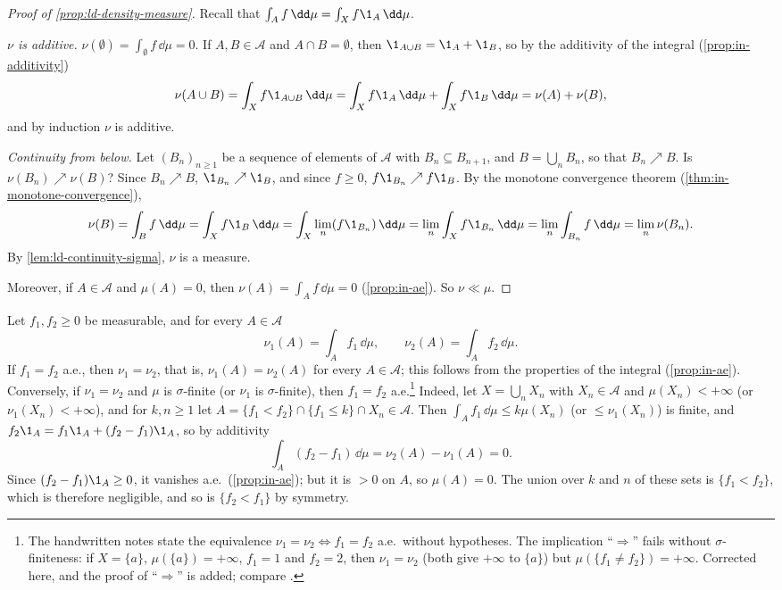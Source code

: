 \begin{proof}[Proof of \cref{prop:ld-density-measure}]
Recall that $\int_Af\,\dd\mu=\int_Xf\1_A\,\dd\mu$.

\emph{$\nu$ is additive.} $\nu(\emptyset)=\int_\emptyset f\,\dd\mu=0$. If $A,B\in\mathcal A$ and
$A\cap B=\emptyset$, then $\1_{A\cup B}=\1_A+\1_B$, so by the additivity of the integral
(\cref{prop:in-additivity})
\[
  \nu(A\cup B)=\int_Xf\1_{A\cup B}\,\dd\mu=\int_Xf\1_A\,\dd\mu+\int_Xf\1_B\,\dd\mu=\nu(A)+\nu(B),
\]
and by induction $\nu$ is additive.

\emph{Continuity from below.} Let $(B_n)_{n\ge1}$ be a sequence of elements of $\mathcal A$ with
$B_n\subseteq B_{n+1}$, and $B=\bigcup_nB_n$, so that $B_n\nearrow B$. Is
$\nu(B_n)\nearrow\nu(B)$? Since $B_n\nearrow B$, $\1_{B_n}\nearrow\1_B$, and since $f\ge0$,
$f\1_{B_n}\nearrow f\1_B$. By the monotone convergence theorem
(\cref{thm:in-monotone-convergence}),
\[
  \nu(B)=\int_Bf\,\dd\mu=\int_Xf\1_B\,\dd\mu=\int_X\lim_n(f\1_{B_n})\,\dd\mu=\lim_n\int_Xf\1_{B_n}\,\dd\mu
  =\lim_n\int_{B_n}f\,\dd\mu=\lim_n\nu(B_n).
\]
By \cref{lem:ld-continuity-sigma}, $\nu$ is a measure.

Moreover, if $A\in\mathcal A$ and $\mu(A)=0$, then $\nu(A)=\int_Af\,\dd\mu=0$
(\cref{prop:in-ae}). So $\nu\ll\mu$.
\end{proof}

\begin{remark}\label{rem:ld-density-unique}
Let $f_1,f_2\ge0$ be measurable, and for every $A\in\mathcal A$
\[
  \nu_1(A)=\int_Af_1\,\dd\mu,\qquad\nu_2(A)=\int_Af_2\,\dd\mu .
\]
If $f_1=f_2$ a.e., then $\nu_1=\nu_2$, that is, $\nu_1(A)=\nu_2(A)$ for every $A\in\mathcal A$;
this follows from the properties of the integral (\cref{prop:in-ae}). Conversely, if $\nu_1=\nu_2$
and $\mu$ is $\sigma$-finite (or $\nu_1$ is $\sigma$-finite), then $f_1=f_2$
a.e.\footnote{The handwritten notes state the equivalence $\nu_1=\nu_2\iff f_1=f_2$ a.e.\ without
hypotheses. The implication ``$\Rightarrow$'' fails without $\sigma$-finiteness: if
$X=\{a\}$, $\mu(\{a\})=+\infty$, $f_1=1$ and $f_2=2$, then $\nu_1=\nu_2$ (both give $+\infty$ to
$\{a\}$) but $\mu(\{f_1\ne f_2\})=+\infty$. Corrected here, and the proof of ``$\Rightarrow$'' is
added; compare \citet[Section~16, ``Densities'']{billingsley}.} Indeed, let
$X=\bigcup_nX_n$ with $X_n\in\mathcal A$ and $\mu(X_n)<+\infty$ (or $\nu_1(X_n)<+\infty$), and for
$k,n\ge1$ let $A=\{f_1<f_2\}\cap\{f_1\le k\}\cap X_n\in\mathcal A$. Then
$\int_Af_1\,\dd\mu\le k\mu(X_n)$ (or $\le\nu_1(X_n)$) is finite, and
$f_2\1_A=f_1\1_A+(f_2-f_1)\1_A$, so by additivity
\[
  \int_A(f_2-f_1)\,\dd\mu=\nu_2(A)-\nu_1(A)=0 .
\]
Since $(f_2-f_1)\1_A\ge0$, it vanishes a.e.\ (\cref{prop:in-ae}); but it is $>0$ on $A$, so
$\mu(A)=0$. The union over $k$ and $n$ of these sets is $\{f_1<f_2\}$, which is therefore
negligible, and so is $\{f_2<f_1\}$ by symmetry.
\end{remark}

